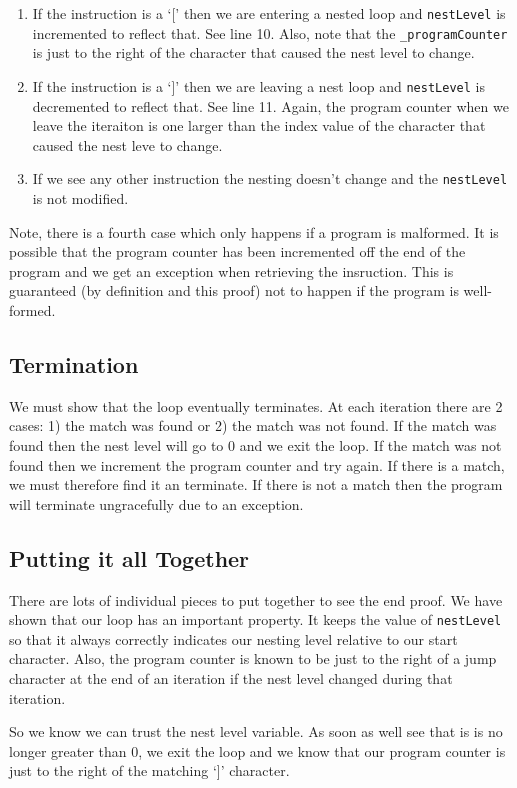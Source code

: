 \documentclass[10pt]{article}
\begin{document}
\begin{enumerate}
\item If the instruction is a `[' then we are entering a nested loop and
\verb!nestLevel! is incremented to reflect that. See line 10. Also,
note that the \verb!_programCounter! is just to the right of the character
that caused the nest level to change.

\item If the instruction is a `]' then we are leaving a nest loop and
\verb!nestLevel! is decremented to reflect that. See line 11. Again,
the program counter when we leave the iteraiton is one larger than
the index value of the character that caused the nest leve to change.

\item If we see any other instruction the nesting doesn't change and
the \verb!nestLevel! is not modified.
\end{enumerate}

Note, there is a fourth case which only happens if a program is
malformed. It is possible that the program counter has been incremented
off the end of the program and we get an exception when retrieving the 
insruction. This is guaranteed (by definition and this proof) not to happen 
if the program is well-formed. 

\subsection*{Termination}
We must show that the loop eventually terminates. At each iteration
there are 2 cases: 1) the match was found or 2) the match was not found.
If the match was found then the nest level will go to 0 and we exit the loop.
If the match was not found then we increment the program counter and try
again. If there is a match, we must therefore find it an terminate. If 
there is not a match then the program will terminate ungracefully due
to an exception.

\subsection*{Putting it all Together}
There are lots of individual pieces to put together to see the end proof.
We have shown that our loop has an important property. It keeps the value
of \verb!nestLevel! so that it always correctly indicates our nesting level
relative to our start character. Also, the program counter is known to be just
to the right of a jump character at the end of an iteration if the nest 
level changed during that iteration.

So we know we can trust the nest level variable. As soon as well see
that is is no longer greater than 0, we exit the loop and we know that our
program counter is just to the right of the matching `]' character.
\end{document}
